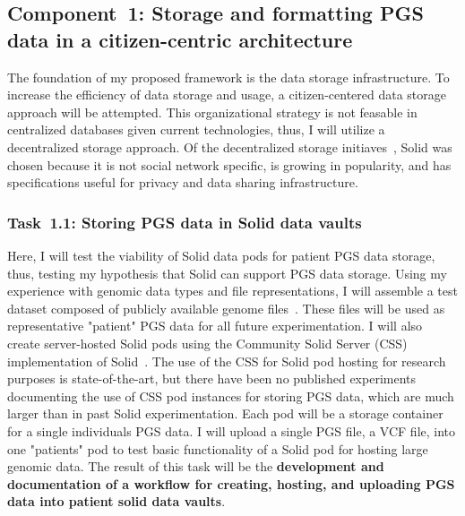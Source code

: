 \documentclass[a4paper,11pt]{article}
\begin{document}
\begin{refsection}
\newcommand\WPa{Storage and formatting PGS data in a citizen-centric architecture}
\subsection{Component~1: \WPa}

The foundation of my proposed framework is the data storage infrastructure.
To increase the efficiency of data storage and usage, a citizen-centered data storage approach will be attempted.
This organizational strategy is not feasable in centralized databases given current technologies, thus, I will utilize a decentralized storage approach.
Of the decentralized storage initiaves~\cite{solid, mastodon, decentralizednanopubs}, Solid was chosen because it is not social network specific, is growing in popularity, and has specifications useful for privacy and data sharing infrastructure.


\newcommand\WPaa{Storing PGS data in Solid data vaults}
\subsubsection{Task~1.1: \WPaa}


Here, I will test the viability of Solid data pods for patient PGS data storage, thus, testing my hypothesis that Solid can support PGS data storage. 
Using my experience with genomic data types and file representations, I will assemble a test dataset composed of publicly available genome files~\cite{platinum_genomes, 1000_genomes}. 
These files will be used as representative "patient" PGS data for all future experimentation. 
I will also create server-hosted Solid pods using the Community Solid Server (CSS) implementation of Solid~\cite{css}. 
The use of the CSS for Solid pod hosting for research purposes is state-of-the-art, but there have been no published experiments documenting the use of CSS pod instances for storing PGS data, which are much larger than in past Solid experimentation.
Each pod will be a storage container for a single individual\textquotesingle s PGS data. 
I will upload a single PGS file, a VCF file, into one "patient\textquotesingle s" pod to test basic functionality of a Solid pod for hosting large genomic data. 
The result of this task will be the \textbf{development and documentation of a workflow for creating, hosting, and uploading PGS data into patient solid data vaults}.



\end{refsection}
\end{document}
